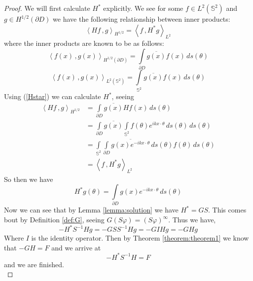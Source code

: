\documentclass[]{article}
\newcommand{\innerprod}[2]{\left\langle #1\,, #2 \right\rangle}
\begin{document}
				\begin{proof}
				We will first calculate $H^\ast$ explicitly. We see for some $f \in L^2(\mathbb S^2)$ and $g\in H^{1/2}(\partial D)$ we have the following relationship between inner products:
				\begin{equation}
					\innerprod{Hf}{g}_{H^{1/2}} = \innerprod{f}{H^\ast g}_{L^2}\label{Hstar}
				\end{equation}
				where the inner products are known to be as follows:
				\begin{equation}
					\innerprod{f(x)}{g(x)}_{H^{1/2}(\partial D)} = \int\limits_{\partial D} \overline{g(x)}f(x)\, ds(\theta)
				\end{equation}
				\begin{equation}
					\innerprod{f(x)}{g(x)}_{L^2(\mathbb S^2)} = \int\limits_{\mathbb S^2}\overline{g(x)}f(x)\, ds(\theta)
				\end{equation}
				Using (\ref{Hstar}) we can calculate $H^\ast$, seeing
				\begin{align}
					\innerprod{Hf}{g}_{H^{1/2}} &=  \int\limits_{\partial D} \overline{g(x)}Hf(x)\, ds(\theta)\\
					 &=  \int\limits_{\partial D} \overline{g(x)} \int\limits_{\mathbb S^2}f(\theta)e^{ikx\cdot \theta}\, ds(\theta) \, ds(\theta)\\
					 &=  \int\limits_{\mathbb S^2}\int\limits_{\partial D}  \overline{g(x)e^{-ikx\cdot \theta}}\, ds(\theta)f(\theta) \, ds(\theta)\\
					 &= \innerprod{f}{H^\ast g}_{L^2}
				\end{align}
				So then we have
				\begin{equation}
					H^\ast g(\theta) = \int\limits_{\partial D}g(x)e^{-ikx\cdot \theta}\, ds(\theta)
				\end{equation}
				Now we can see that by Lemma \ref{lemma:solution} we have $H^\ast = GS$. This comes bout by Definition \ref{def:G}, seeing $G(S\varphi) = (S\varphi)^\infty$. Thus we have,
				\begin{equation}
					 -H^\ast S^{-1}Hg = -GSS^{-1}Hg = -GIHg = -GHg
				\end{equation}
				Where $I$ is the identity operator. Then by Theorem \ref{theorem:theorem1} we know that $-GH = F$ and we arrive at
				\begin{equation}
					-H^\ast S^{-1}H = F
				\end{equation} and we are finished.\\
			\end{proof}
\end{document}
